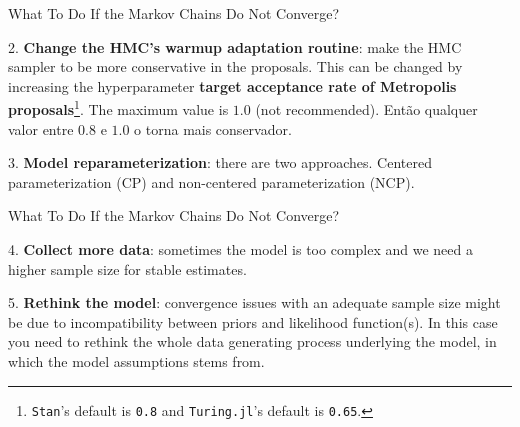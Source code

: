 \begin{frame}{What To Do If the Markov Chains Do Not Converge?}
    \begin{vfilleditems}
        \item[2.] \textbf{Change the HMC's warmup adaptation routine}:
        make the HMC sampler to be more conservative in the proposals.
        This can be changed by increasing the hyperparameter
        \textbf{target acceptance rate of Metropolis proposals}\footnote{
            \texttt{Stan}'s default is \texttt{0.8} and
            \texttt{Turing.jl}'s default is \texttt{0.65}.}.
        The maximum value is $1.0$ (not recommended).
        Então qualquer valor entre $0.8$ e $1.0$ o torna mais conservador.
        \item[3.] \textbf{Model reparameterization}:
        there are two approaches.
        Centered parameterization (CP) and non-centered parameterization (NCP).
    \end{vfilleditems}
\end{frame}

\begin{frame}{What To Do If the Markov Chains Do Not Converge?}
    \begin{vfilleditems}
        \item[4.] \textbf{Collect more data}:
        sometimes the model is too complex and we need a higher sample size for stable estimates.
        \item[5.] \textbf{Rethink the model}:
        convergence issues with an adequate sample size might be due to
        incompatibility between priors and likelihood function(s).
        In this case you need to rethink the whole data generating process
        underlying the model, in which the model assumptions stems from.
    \end{vfilleditems}
\end{frame}